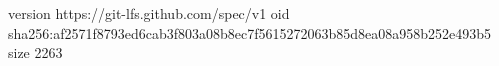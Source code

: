 version https://git-lfs.github.com/spec/v1
oid sha256:af2571f8793ed6cab3f803a08b8ec7f5615272063b85d8ea08a958b252e493b5
size 2263
